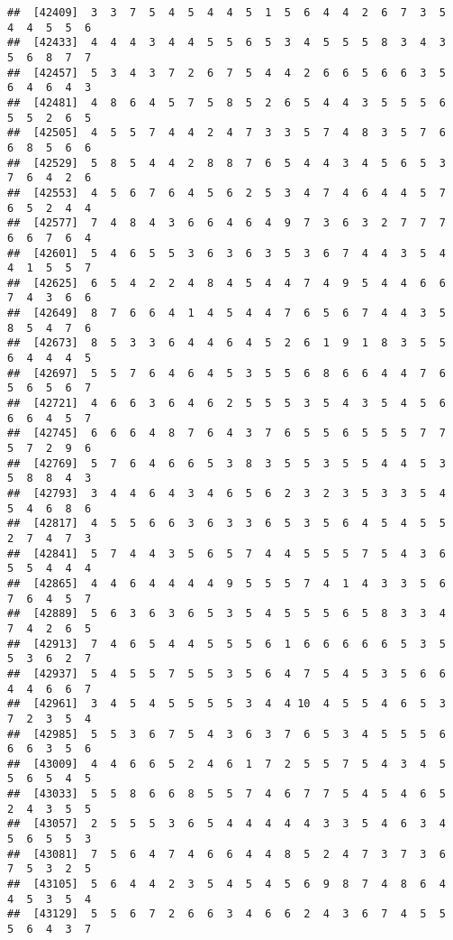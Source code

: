 \documentclass[
]{book}
\begin{document}
\begin{verbatim}
##  [42409]  3  3  7  5  4  5  4  4  5  1  5  6  4  4  2  6  7  3  5  4  4  5  5  6
##  [42433]  4  4  4  3  4  4  5  5  6  5  3  4  5  5  5  8  3  4  3  5  6  8  7  7
##  [42457]  5  3  4  3  7  2  6  7  5  4  4  2  6  6  5  6  6  3  5  6  4  6  4  3
##  [42481]  4  8  6  4  5  7  5  8  5  2  6  5  4  4  3  5  5  5  6  5  5  2  6  5
##  [42505]  4  5  5  7  4  4  2  4  7  3  3  5  7  4  8  3  5  7  6  6  8  5  6  6
##  [42529]  5  8  5  4  4  2  8  8  7  6  5  4  4  3  4  5  6  5  3  7  6  4  2  6
##  [42553]  4  5  6  7  6  4  5  6  2  5  3  4  7  4  6  4  4  5  7  6  5  2  4  4
##  [42577]  7  4  8  4  3  6  6  4  6  4  9  7  3  6  3  2  7  7  7  6  6  7  6  4
##  [42601]  5  4  6  5  5  3  6  3  6  3  5  3  6  7  4  4  3  5  4  4  1  5  5  7
##  [42625]  6  5  4  2  2  4  8  4  5  4  4  7  4  9  5  4  4  6  6  7  4  3  6  6
##  [42649]  8  7  6  6  4  1  4  5  4  4  7  6  5  6  7  4  4  3  5  8  5  4  7  6
##  [42673]  8  5  3  3  6  4  4  6  4  5  2  6  1  9  1  8  3  5  5  6  4  4  4  5
##  [42697]  5  5  7  6  4  6  4  5  3  5  5  6  8  6  6  4  4  7  6  5  6  5  6  7
##  [42721]  4  6  6  3  6  4  6  2  5  5  5  3  5  4  3  5  4  5  6  6  6  4  5  7
##  [42745]  6  6  6  4  8  7  6  4  3  7  6  5  5  6  5  5  5  7  7  5  7  2  9  6
##  [42769]  5  7  6  4  6  6  5  3  8  3  5  5  3  5  5  4  4  5  3  5  8  8  4  3
##  [42793]  3  4  4  6  4  3  4  6  5  6  2  3  2  3  5  3  3  5  4  5  4  6  8  6
##  [42817]  4  5  5  6  6  3  6  3  3  6  5  3  5  6  4  5  4  5  5  2  7  4  7  3
##  [42841]  5  7  4  4  3  5  6  5  7  4  4  5  5  5  7  5  4  3  6  5  5  4  4  4
##  [42865]  4  4  6  4  4  4  4  9  5  5  5  7  4  1  4  3  3  5  6  7  6  4  5  7
##  [42889]  5  6  3  6  3  6  5  3  5  4  5  5  5  6  5  8  3  3  4  7  4  2  6  5
##  [42913]  7  4  6  5  4  4  5  5  5  6  1  6  6  6  6  6  5  3  5  5  3  6  2  7
##  [42937]  5  4  5  5  7  5  5  3  5  6  4  7  5  4  5  3  5  6  6  4  4  6  6  7
##  [42961]  3  4  5  4  5  5  5  5  3  4  4 10  4  5  5  4  6  5  3  7  2  3  5  4
##  [42985]  5  5  3  6  7  5  4  3  6  3  7  6  5  3  4  5  5  5  6  6  6  3  5  6
##  [43009]  4  4  6  6  5  2  4  6  1  7  2  5  5  7  5  4  3  4  5  5  6  5  4  5
##  [43033]  5  5  8  6  6  8  5  5  7  4  6  7  7  5  4  5  4  6  5  2  4  3  5  5
##  [43057]  2  5  5  5  3  6  5  4  4  4  4  4  3  3  5  4  6  3  4  5  6  5  5  3
##  [43081]  7  5  6  4  7  4  6  6  4  4  8  5  2  4  7  3  7  3  6  7  5  3  2  5
##  [43105]  5  6  4  4  2  3  5  4  5  4  5  6  9  8  7  4  8  6  4  4  5  3  5  4
##  [43129]  5  5  6  7  2  6  6  3  4  6  6  2  4  3  6  7  4  5  5  5  6  4  3  7

\end{verbatim}
\end{document}
